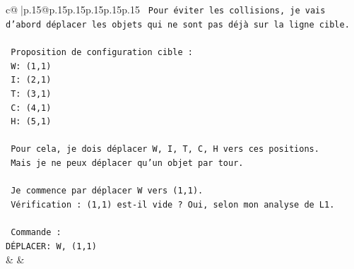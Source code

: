 \documentclass{article}
\begin{document}
{\begin{supertabular}{c@{$\;$}|p{.15\linewidth}@{}p{.15\linewidth}p{.15\linewidth}p{.15\linewidth}p{.15\linewidth}p{.15\linewidth}}
{{{\texttt{  Pour éviter les collisions, je vais d'abord déplacer les objets qui ne sont pas déjà sur la ligne cible.} \\
\\ 
\texttt{  Proposition de configuration cible :} \\
\texttt{  W: (1,1)} \\
\texttt{  I: (2,1)} \\
\texttt{  T: (3,1)} \\
\texttt{  C: (4,1)} \\
\texttt{  H: (5,1)} \\
\\ 
\texttt{  Pour cela, je dois déplacer W, I, T, C, H vers ces positions.} \\
\texttt{  Mais je ne peux déplacer qu'un objet par tour.} \\
\\ 
\texttt{  Je commence par déplacer W vers (1,1).} \\
\texttt{  Vérification : (1,1) est{-}il vide ? Oui, selon mon analyse de L1.} \\
\\ 
\texttt{  Commande :} \\
\texttt{DÉPLACER: W, (1,1)} \\
            }
        }
    }
    & & \\ \\


\end{supertabular}}
\end{document}
